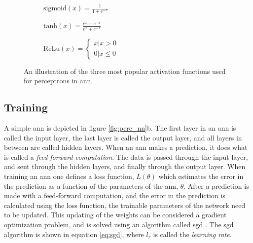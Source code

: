 \begin{figure}[H]
    \centering
    \begin{subfigure}[b]{0.32\textwidth}
        \centering
        
        \caption{$\mathrm{sigmoid}(x) = \frac{1}{1+e^{-x}}$}
        \label{fig:sigmoid}
    \end{subfigure}
    \begin{subfigure}[b]{0.32\textwidth}
        \centering
        
        \caption{$\mathrm{tanh}(x) = \frac{e^{x}-e^{-x}}{e^{x}+e^{-x}}$}
        \label{fig:tanh}
    \end{subfigure}
    \begin{subfigure}[b]{0.32\textwidth}
        \centering
        
        \caption{$\mathrm{ReLu}(x) = \left\{\begin{matrix}x | x>0\\ 0 | x \leq 0\end{matrix}\right.$}
        \label{fig:relu}
    \end{subfigure}
    \caption{An illustration of the three most popular activation functions used for perceptrons in \acrshort{ann}.}
    \label{fig:obj_funcs}
\end{figure}

\subsection{Training} \label{sec:nn_training}
A simple \acrshort{ann} is depicted in figure \ref{fig:perc_nn}b. The first layer in an \acrshort{ann} is called the input layer, the last layer is called the output layer, and all layers in between are called hidden layers. When an \acrshort{ann} makes a prediction, it does what is called a \textit{feed-forward computation}. The data is passed through the input layer, and sent through the hidden layers, and finally through the output layer. When training an \acrshort{ann} one defines a loss function, $L(\theta)$ which estimates the error in the prediction as a function of the parameters of the \acrshort{ann}, $\theta$. After a prediction is made with a feed-forward computation, and the error in the prediction is calculated using the loss function, the trainable parameters of the network need to be updated. This updating of the weights can be considered a gradient optimization problem, and is solved using an algorithm called \acrfull{sgd} \cite{dl_book}. The \acrshort{sgd} algorithm is shown in equation \eqref{eq:sgd}, where $l_r$ is called the \textit{learning rate}.

